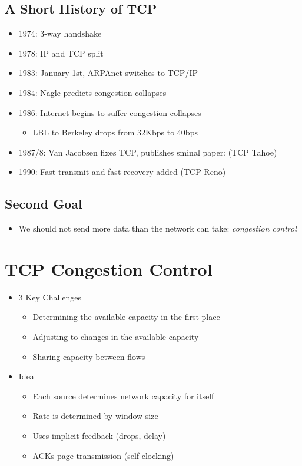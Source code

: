 \subsection{A Short History of TCP}
\begin{itemize}
    \item 1974: 3-way handshake
    \item 1978: IP and TCP split
    \item 1983: January 1st, ARPAnet switches to TCP/IP
    \item 1984: Nagle predicts congestion collapses
    \item 1986: Internet begins to suffer congestion collapses
          \begin{itemize}
              \item LBL to Berkeley drops from 32Kbps to 40bps
          \end{itemize}
    \item 1987/8: Van Jacobsen fixes TCP, publishes sminal paper: (TCP Tahoe)
    \item 1990: Fast transmit and fast recovery added (TCP Reno)
\end{itemize}

\subsection{Second Goal}
\begin{itemize}
    \item We should not send more data than the network can take: \emph{congestion control}
\end{itemize}

\section{TCP Congestion Control}
\begin{itemize}
    \item 3 Key Challenges
          \begin{itemize}
              \item Determining the available capacity in the first place
              \item Adjusting to changes in the available capacity
              \item Sharing capacity between flows
          \end{itemize}
    \item Idea
          \begin{itemize}
              \item Each source determines network capacity for itself
              \item Rate is determined by window size
              \item Uses implicit feedback (drops, delay)
              \item ACKs page transmission (self-clocking)
          \end{itemize}
\end{itemize}

